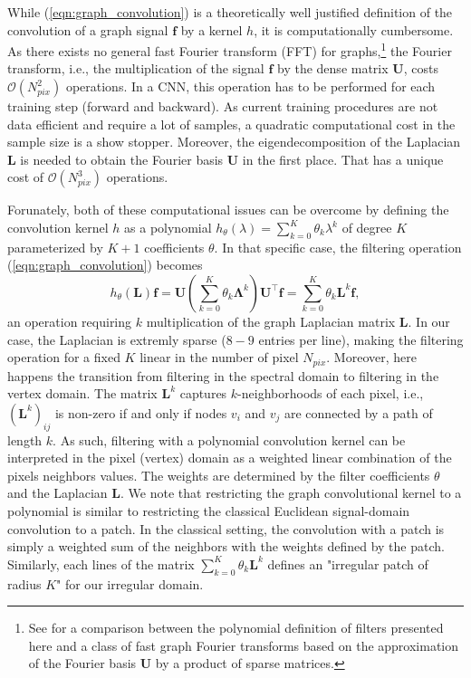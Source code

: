\documentclass[final,twocolumn,3p,times,authoryear]{elsarticle}
\newcommand{\nati}[1]{{\color[rgb]{.1,.6,.1}{#1}}}
\newcommand{\todo}[1]{{\color[rgb]{.6,.1,.6}{#1}}}
\newcommand{\eqnref}[1]{(\ref{eqn:#1})}
\renewcommand{\b}[1]{{\bm{#1}}}   %
\newcommand{\1}{\b{1}}              %
\newcommand{\0}{\b{0}}              %
\renewcommand{\L}{\b{L}}
\newcommand{\U}{\b{U}}
\newcommand{\f}{\b{f}}
\newcommand{\trans}{^\intercal}
\newcommand{\bLambda}{\b{\Lambda}}
\newcommand{\bO}{\mathcal{O}}
\begin{document}
While \eqnref{graph_convolution} is a theoretically well justified definition of the convolution of a graph signal $\f$ by a kernel $h$, it is computationally cumbersome. As there exists no general fast Fourier transform (FFT) for graphs,\footnote{See \citep{le2018fgft} for a comparison between the polynomial definition of filters presented here and a class of fast graph Fourier transforms based on the approximation of the Fourier basis $\U$ by a product of sparse matrices.} the Fourier transform, i.e., the multiplication of the signal $\f$ by the dense matrix $\U$, costs $\bO(N_{pix}^2)$ operations. In a CNN, this operation has to be performed for each training step (forward and backward). As current training procedures are not data efficient and require a lot of samples, a quadratic computational cost in the sample size is a show stopper.
Moreover, the eigendecomposition of the Laplacian $\L$ is needed to obtain the Fourier basis $\U$ in the first place. That has a unique cost of $\bO(N_{pix}^3)$ operations.

Forunately, both of these computational issues can be overcome by defining the convolution kernel $h$ as a polynomial $h_\theta(\lambda) = \sum_{k=0}^K \theta_k \lambda^k$ of degree $K$ parameterized by $K+1$ coefficients $\theta$. In that specific case, the filtering operation \eqnref{graph_convolution} becomes
\begin{equation} \label{eqn:graph_convolution_polynomial}
	h_\theta(\L) \f =  \U \left(\sum_{k=0}^K \theta_k \bLambda^k \right) \U\trans \f = \sum_{k=0}^K \theta_k \L^k \f,
\end{equation}
an operation requiring $k$ multiplication of the graph Laplacian matrix $\L$.
In our case, the Laplacian is extremly sparse ($8-9$ entries per line), making the filtering operation for a fixed $K$ linear in the number of pixel $N_{pix}$.
Moreover, here happens the transition from filtering in the spectral domain to filtering in the vertex domain. The matrix $\L^k$ captures $k$-neighborhoods of each pixel, i.e., $(\L^k)_{ij}$ is non-zero if and only if nodes $v_i$ and $v_j$ are connected by a path of length $k$.
As such, filtering with a polynomial convolution kernel can be interpreted in the pixel (vertex) domain as a weighted linear combination of the pixels neighbors values. The weights are determined by the filter coefficients $\theta$ and the Laplacian $\L$.
We note that restricting the graph convolutional kernel to a polynomial is similar to restricting the classical Euclidean signal-domain convolution to a patch. In the classical setting, the convolution with a patch is simply a weighted sum of the neighbors with the weights defined by the patch. Similarly, each lines of the matrix $\sum_{k=0}^K \theta_k \L^k$ defines an "irregular patch of radius $K$" for our irregular domain.
\todo{Better vertex domain explanation. \nati{I gave it a try. Should we take a single vertex and explain what heppens to it? Note that I suppressed the following paragraph. }}
\end{document}

